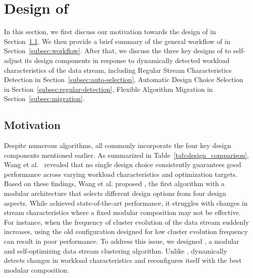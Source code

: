 \section{Design of \algo}
\label{sec:algorithm_design}
In this section, we first discuss our motivation towards the design of \algo in Section~\ref{subsec:motivation}. We then provide a brief summary of the general workflow of \algo in Section~\ref{subsec:workflow}. After that, we discuss the three key designs of \algo to self-adjust its design components in response to dynamically detected workload characteristics of the data stream, including Regular Stream Characteristics Detection in Section~\ref{subsec:auto-selection}, Automatic Design Choice Selection in Section~\ref{subsec:regular-detection}, Flexible Algorithm Migration in Section~\ref{subsec:migration}.

\subsection{Motivation} 
\label{subsec:motivation} 
Despite numerous \dsc algorithms, all commonly incorporate the four key design components mentioned earlier. As summarized in Table~\ref{tab:design_comparison}, Wang et al.~\cite{wang2023sesame} revealed that no single design choice consistently guarantees good performance across varying workload characteristics and optimization targets. Based on these findings, Wang et al. proposed \benne, the first \dsc algorithm with a modular architecture that selects different design options from four design aspects. While \benne achieved state-of-the-art performance, it struggles with changes in stream characteristics where a fixed modular composition may not be effective. For instance, when the frequency of cluster evolution of the data stream suddenly increases, using the old configuration designed for low cluster evolution frequency can result in poor performance. To address this issue, we designed \algo, a modular and self-optimizing data stream clustering algorithm. Unlike \benne, \algo dynamically detects changes in workload characteristics and reconfigures itself with the best modular composition.

